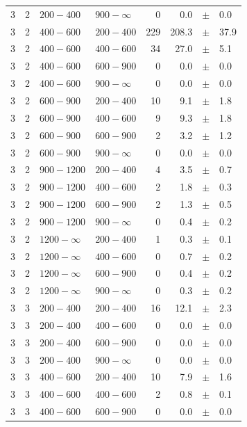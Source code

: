 \begin{table}[!h]
\begin{tabular}{rrllrrcl}
3 & 2 & $ 200- 400$ & $900-\infty$ &      0 &      0.0 &$\pm$&    0.0 \\
3 & 2 & $ 400- 600$ & $200-400$ &    229 &    208.3 &$\pm$&   37.9 \\
3 & 2 & $ 400- 600$ & $400-600$ &     34 &     27.0 &$\pm$&    5.1 \\
3 & 2 & $ 400- 600$ & $600-900$ &      0 &      0.0 &$\pm$&    0.0 \\
3 & 2 & $ 400- 600$ & $900-\infty$ &      0 &      0.0 &$\pm$&    0.0 \\
3 & 2 & $ 600- 900$ & $200-400$ &     10 &      9.1 &$\pm$&    1.8 \\
3 & 2 & $ 600- 900$ & $400-600$ &      9 &      9.3 &$\pm$&    1.8 \\
3 & 2 & $ 600- 900$ & $600-900$ &      2 &      3.2 &$\pm$&    1.2 \\
3 & 2 & $ 600- 900$ & $900-\infty$ &      0 &      0.0 &$\pm$&    0.0 \\
3 & 2 & $ 900-1200$ & $200-400$ &      4 &      3.5 &$\pm$&    0.7 \\
3 & 2 & $ 900-1200$ & $400-600$ &      2 &      1.8 &$\pm$&    0.3 \\
3 & 2 & $ 900-1200$ & $600-900$ &      2 &      1.3 &$\pm$&    0.5 \\
3 & 2 & $ 900-1200$ & $900-\infty$ &      0 &      0.4 &$\pm$&    0.2 \\
3 & 2 & $1200- \infty$ & $200-400$ &      1 &      0.3 &$\pm$&    0.1 \\
3 & 2 & $1200- \infty$ & $400-600$ &      0 &      0.7 &$\pm$&    0.2 \\
3 & 2 & $1200- \infty$ & $600-900$ &      0 &      0.4 &$\pm$&    0.2 \\
3 & 2 & $1200- \infty$ & $900-\infty$ &      0 &      0.3 &$\pm$&    0.2 \\
3 & 3 & $ 200- 400$ & $200-400$ &     16 &     12.1 &$\pm$&    2.3 \\
3 & 3 & $ 200- 400$ & $400-600$ &      0 &      0.0 &$\pm$&    0.0 \\
3 & 3 & $ 200- 400$ & $600-900$ &      0 &      0.0 &$\pm$&    0.0 \\
3 & 3 & $ 200- 400$ & $900-\infty$ &      0 &      0.0 &$\pm$&    0.0 \\
3 & 3 & $ 400- 600$ & $200-400$ &     10 &      7.9 &$\pm$&    1.6 \\
3 & 3 & $ 400- 600$ & $400-600$ &      2 &      0.8 &$\pm$&    0.1 \\
3 & 3 & $ 400- 600$ & $600-900$ &      0 &      0.0 &$\pm$&    0.0 \\

\end{tabular}
\end{table}
